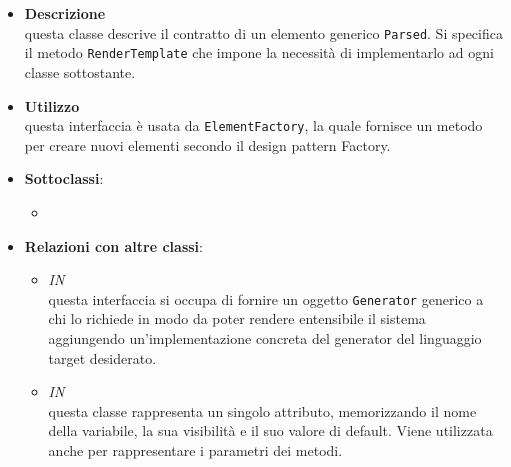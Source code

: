 \label{\nogloxy{swedesigner::server::project::ParsedElement}}
\begin{figure}[h]
\centering
{}
\caption{}
\end{figure}
\FloatBarrier
\begin{itemize}
\item \textbf{Descrizione}\\
questa classe descrive il contratto di un elemento generico \texttt{Parsed}. Si specifica il metodo \texttt{RenderTemplate} che impone la necessità di implementarlo ad ogni classe sottostante.
\item \textbf{Utilizzo}\\
questa interfaccia è usata da \texttt{ElementFactory}, la quale fornisce un metodo per creare nuovi elementi secondo il design pattern Factory. %
\item \textbf{Sottoclassi}:
\begin{itemize}
\item \hyperref[\nogloxy{swedesigner::server::project::ParsedMethod}]{}
\end{itemize}
\item \textbf{Relazioni con altre classi}:
\begin{itemize}
\item \textit{IN} \hyperref[\nogloxy{swedesigner::server::generator::Generator}]{}\\
questa interfaccia si occupa di fornire un oggetto \texttt{Generator} generico a chi lo richiede in modo da poter rendere entensibile il sistema aggiungendo un'implementazione concreta del generator del linguaggio target desiderato.
\item \textit{IN} \hyperref[\nogloxy{swedesigner::server::project::ParsedAttribute}]{}\\
questa classe rappresenta un singolo attributo, memorizzando il nome della variabile, la sua visibilità e il suo valore di default. Viene utilizzata anche per rappresentare i parametri dei metodi.

\end{itemize}
\end{itemize}
